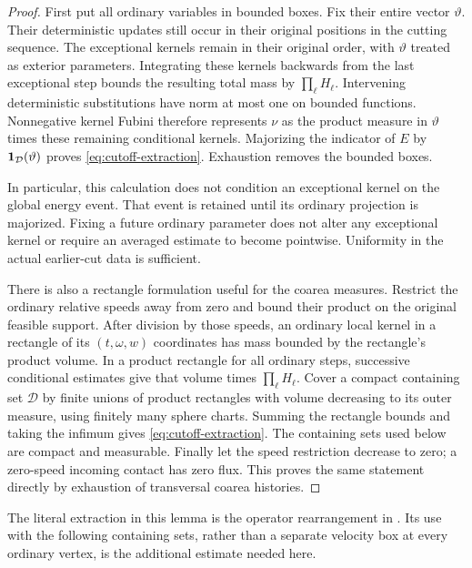 \begin{proof}
First put all ordinary variables in bounded boxes.  Fix their
entire vector \(\vartheta\).  Their deterministic updates still
occur in their original positions in the cutting sequence.
The exceptional kernels remain in their original order, with
\(\vartheta\) treated as exterior parameters.  Integrating these
kernels backwards from the last exceptional step bounds the
resulting total mass by \(\prod_\ell H_\ell\).
Intervening deterministic substitutions have norm at most one
on bounded functions.  Nonnegative kernel Fubini therefore
represents \(\nu\) as the product measure in \(\vartheta\)
times these remaining conditional kernels.  Majorizing the
indicator of \(E\) by \(\mathbf 1_{\mathcal D}(\vartheta)\) proves
\eqref{eq:cutoff-extraction}.  Exhaustion removes the bounded
boxes.

In particular, this calculation does not condition an exceptional
kernel on the global energy event.  That event is retained until
its ordinary projection is majorized.  Fixing a future ordinary
parameter does not alter any exceptional kernel or require an
averaged estimate to become pointwise.  Uniformity in the actual
earlier-cut data is sufficient.

There is also a rectangle formulation useful for the coarea
measures.  Restrict the ordinary relative speeds away from zero
and bound their product on the original feasible support.
After division by those speeds, an ordinary local kernel in a
rectangle of its \((t,\omega,w)\) coordinates has mass bounded
by the rectangle's product volume.  In a product rectangle
for all ordinary steps, successive conditional estimates give
that volume times \(\prod_\ell H_\ell\).  Cover a compact
containing set \(\mathcal D\) by finite unions of product
rectangles with volume decreasing to its outer measure,
using finitely many sphere charts.  Summing the rectangle
bounds and taking the infimum gives
\eqref{eq:cutoff-extraction}.  The containing sets used below
are compact and measurable.  Finally let the speed restriction
decrease to zero; a zero-speed incoming contact has zero flux.
This proves the same statement directly by exhaustion of
transversal coarea histories.
\end{proof}

The literal extraction in this lemma is the operator rearrangement
in \cite[Equations (9.66), (9.74)--(9.77)]{DHM2025}.
Its use with the following containing sets, rather than a
separate velocity box at every ordinary vertex, is the additional
estimate needed here.


